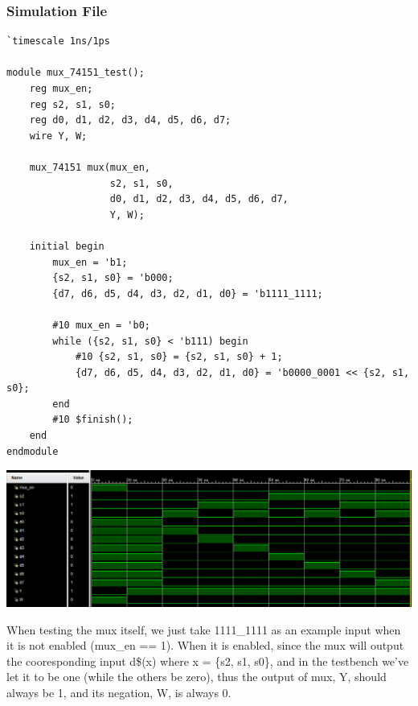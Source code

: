 \documentclass[onecolumn, oneside, ctexart]{SUSTechHomework}
\begin{document}
\subsubsection*{Simulation File}
\begin{lstlisting}
`timescale 1ns/1ps

module mux_74151_test();
    reg mux_en;
    reg s2, s1, s0;
    reg d0, d1, d2, d3, d4, d5, d6, d7;
    wire Y, W;

    mux_74151 mux(mux_en,
                  s2, s1, s0,
                  d0, d1, d2, d3, d4, d5, d6, d7,
                  Y, W);

    initial begin
        mux_en = 'b1;
        {s2, s1, s0} = 'b000;
        {d7, d6, d5, d4, d3, d2, d1, d0} = 'b1111_1111;

        #10 mux_en = 'b0;
        while ({s2, s1, s0} < 'b111) begin
            #10 {s2, s1, s0} = {s2, s1, s0} + 1;
            {d7, d6, d5, d4, d3, d2, d1, d0} = 'b0000_0001 << {s2, s1, s0};
        end
        #10 $finish();
    end
endmodule
\end{lstlisting}
\vspace{-2em}
\centerline{\includegraphics[width=\textwidth]{fig/t3}}
\par When testing the mux itself, we just take 1111\_1111 as an example input when it is not enabled (mux\_en == 1). When it is enabled, since the mux will output the cooresponding input d\$(x) where x = \{s2, s1, s0\}, and in the testbench we've let it to be one (while the others be zero), thus the output of mux, Y, should always be 1, and its negation, W, is always 0.
\end{document}
